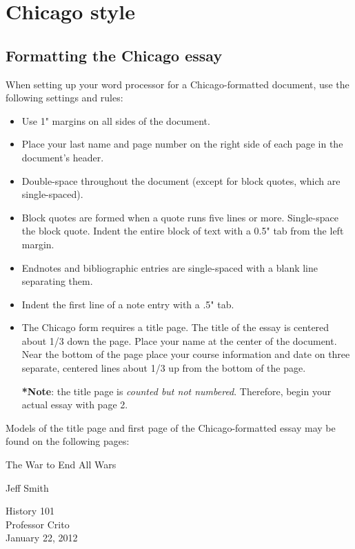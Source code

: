 
\chapter{Chicago style}

\section {Formatting the Chicago essay}

When setting up your word processor for a Chicago-formatted document, use the 
following settings and rules:

\begin{itemize}

\item Use 1" margins on all sides of the document.
\item Place your last name and page number on the right side of each page in the 
document's header.
\item Double-space throughout the document (except for block quotes, which are 
single-spaced).
\item Block quotes are formed when a quote runs five lines or more. Single-space the 
block quote. Indent the entire block of text with a 0.5" tab from the left margin.
\item Endnotes and bibliographic entries are single-spaced with a blank line separating 
them.
\item Indent the first line of a note entry with a .5" tab.
\item The Chicago form requires a title page. The title of the essay is centered about 
1/3 down the page. Place your name at the center of the document. Near the bottom 
of the page place your course information and date on three separate, centered lines 
about 1/3 up from the bottom of the page.

\textbf{*}\textbf{Note}: the title page is \emph{counted but not numbered}. Therefore, 
begin your actual essay with page 2.
\end{itemize}

Models of the title page and first page of the Chicago-formatted essay may be found on 
the following pages:

\newpage
\thispagestyle{empty}
\begin{Spacing}{2}
\vspace* {3cm}
\begin{center}The War to End All Wars\end{center}
\vspace {4cm}
\begin{center}Jeff Smith\end{center}
\vspace {5cm}
\begin{center}History 101\\
Professor Crito\\
January 22, 2012\end{center}
\end{Spacing}
\newpage

